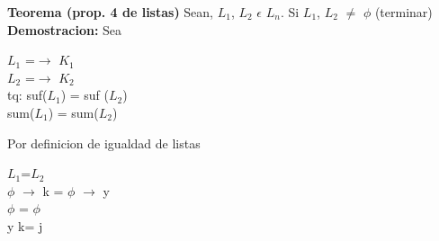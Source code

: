 \documentclass{article}
\begin{document}
        \textbf{Teorema (prop. 4 de listas)}
        Sean, $L_{1}$, $L_{2}$ $\epsilon$ $L_{n}$. Si $L_{1}$, $L_{2}$ $\neq$ $\phi$ (terminar)
        \newline
        \textbf{Demostracion:}
        Sea \begin{center}
            $L_{1}$ =$\rightarrow$ $K_{1}$ \\
            $L_{2}$ =$\rightarrow$ $K_{2}$ \\
            tq: suf($L_{1}$) = suf ($L_{2}$) \\
            sum($L_{1}$) = sum($L_{2}$)
        \end{center}
        Por definicion de igualdad de listas 
        \begin{center}
            $L_{1}$=$L_{2}$ \\
            $\phi$ $\rightarrow$ k = $\phi$ $\rightarrow$ y \\
        $\phi$ = $\phi$ \\
        y k= j
        \end{center}
        
\end{document}
